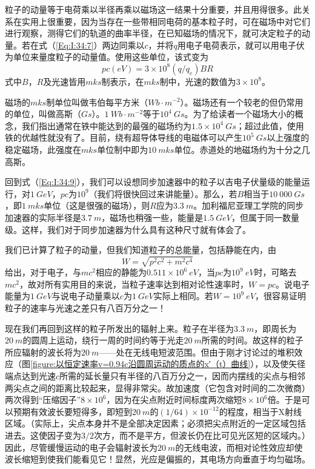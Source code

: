 粒子的动量等于电荷乘以半径再乘以磁场这一结果十分重要，并且用得很多。此关系在实用上很重要，因为当存在一些带相同电荷的基本粒子时，可在磁场中对它们进行观察，测得它们的轨道的曲率半径，在已知磁场的情况下，就可决定粒子的动量。若在式（\ref{Eq:I:34:7}）两边同乘以$c$，并将$q$用电子电荷表示，就可以用电子伏为单位来量度粒子的动量值。使用这些单位，该式变为
\begin{equation}
    \label{Eq:I:34:9}
    pc(eV) = 3\times 10^8 (q/q_e)BR
\end{equation}
式中$B$，$R$及光速皆用$mks$制表示，在$mks$制中，光速的数值为$3\times 10^8$。

磁场的$mks$制单位叫做韦伯每平方米（$Wb\cdot m^{-2}$）。磁场还有一个较老的但仍常用的单位，叫做高斯（$Gs$）。$1~Wb\cdot m^{-2}$等于$10^4~Gs$。为了给读者一个磁场大小的概念，我们指出通常在铁中能达到的最强的磁场约为$1.5\times 10^4~Gs$；超过此值，使用铁的优越性就没有了。目前，绕有超导体导线的电磁体可以产生$10^5~Gs$以上强度的稳定磁场，此强度在$mks$单位制中即为$10~mks$单位。赤道处的地磁场约为十分之几高斯。

回到式（\ref{Eq:I:34:9}），我们可以设想同步加速器中的粒子以吉电子伏量级的能量运行，对$1~GeV$，$pc$为$10^9$（我们将很快回过来讲能量）。那么，若$B$相当于$10~000~Gs$，即$1~mks$单位（这是很强的磁场），则$R$应为$3.3~m$。加利福尼亚理工学院的同步加速器的实际半径是$3.7~m$，磁场也稍强一些，能量是$1.5~GeV$，但属于同一数量级。这样，我们对于同步加速器为什么具有这种尺寸就有体会了。

我们已计算了粒子的动量，但我们知道粒子的总能量，包括静能在内，由
\begin{equation*}
    W=\sqrt{p^2c^2 + m^2c^4}
\end{equation*}
给出，对于电子，与$mc^2$相应的静能为$0.511\times 10^6~eV$，当$pc$为$10^9~eV$时，可略去$mc^2$，故对所有实用目的来说，当粒子速率达到相对论性速率时，$W=pc$。说电子能量为$1~GeV$与说电子动量乘以$c$为$1~GeV$实际上相同。若$W=10^9~eV$，很容易证明粒子的速率与光速之差只有八百万分之一！

现在我们再回到这样的粒子所发出的辐射上来。粒子在半径为$3.3~m$，即周长为$20~m$的圆周上运动，绕行一周的时间约等于光走$20~m$所需的时间。故这样的粒子所应辐射的波长将为$20~m$——处在无线电短波范围。但由于刚才讨论过的堆积效应（图\ref{figure:以恒定速率v=0.94c沿圆周运动的质点的x′（t）曲线}），以及使矢径端点达到光速$c$所需的延长量只有半径的八百万分之一，因而内摆线的尖点与相邻两尖点之间的距离比较起来，显得非常尖。故加速度（它包含对时间的二次微商）两次得到“压缩因子”$8\times 10^6$，因为在尖点附近时间标度两次缩短$8\times 10^6$倍。于是可以预期有效波长要短得多，即短到$20~m$的$(1/64)\times 10^{-12}$的程度，相当于X射线区域。（实际上，尖点本身并不是全部决定因素；必须把尖点附近的一定区域包括进去。这使因子变为$3/2$次方，而不是平方，但波长仍在比可见光区短的区域内。）因此，尽管缓慢运动的电子会辐射波长为$20~m$的无线电波，而相对论性效应却使波长缩短到使我们能看见它！显然，光应是偏振的，其电场方向垂直于均匀磁场。

